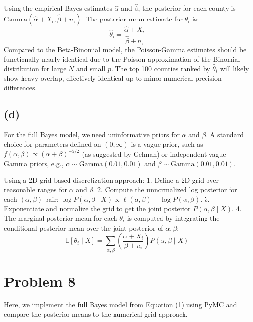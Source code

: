 \documentclass[
  letterpaper,
  DIV=11,
  numbers=noendperiod]{scrartcl}
\begin{document}
Using the empirical Bayes estimates \(\hat{\alpha}\) and
\(\hat{\beta}\), the posterior for each county is
\(\text{Gamma}(\hat{\alpha} + X_i, \hat{\beta} + n_i)\). The posterior
mean estimate for \(\theta_i\) is: \[
\hat{\theta}_i = \frac{\hat{\alpha} + X_i}{\hat{\beta} + n_i}
\] Compared to the Beta-Binomial model, the Poisson-Gamma estimates
should be functionally nearly identical due to the Poisson approximation
of the Binomial distribution for large \(N\) and small \(p\). The top
100 counties ranked by \(\hat{\theta}_i\) will likely show heavy
overlap, effectively identical up to minor numerical precision
differences.

\subsection{(d)}\label{d-2}

For the full Bayes model, we need uninformative priors for \(\alpha\)
and \(\beta\). A standard choice for parameters defined on
\((0, \infty)\) is a vague prior, such as
\(f(\alpha, \beta) \propto (\alpha + \beta)^{-5/2}\) (as suggested by
Gelman) or independent vague Gamma priors, e.g.,
\(\alpha \sim \text{Gamma}(0.01, 0.01)\) and
\(\beta \sim \text{Gamma}(0.01, 0.01)\).

Using a 2D grid-based discretization approach: 1. Define a 2D grid over
reasonable ranges for \(\alpha\) and \(\beta\). 2. Compute the
unnormalized log posterior for each \((\alpha, \beta)\) pair:
\(\log P(\alpha, \beta \mid X) \propto \ell(\alpha, \beta) + \log P(\alpha, \beta)\).
3. Exponentiate and normalize the grid to get the joint posterior
\(P(\alpha, \beta \mid X)\). 4. The marginal posterior mean for each
\(\theta_i\) is computed by integrating the conditional posterior mean
over the joint posterior of \(\alpha, \beta\): \[
\mathbb{E}[\theta_i \mid X] = \sum_{\alpha, \beta} \left( \frac{\alpha + X_i}{\beta + n_i} \right) P(\alpha, \beta \mid X)
\]

\section{Problem 8}\label{problem-8}

Here, we implement the full Bayes model from Equation (1) using PyMC and
compare the posterior means to the numerical grid approach.
\end{document}
